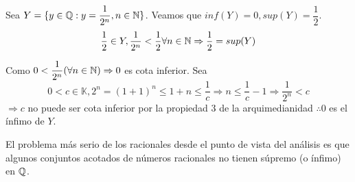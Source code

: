 \begin{eg}
    Sea $Y = \{ y \in \mathbb{Q} : y=\dfrac{1}{2^n}, n\in \mathbb{N} \}$. Veamos que $inf(Y) =0, sup(Y) = \dfrac{1}{2}$.
    \begin{equation}
        \dfrac{1}{2} \in Y, \dfrac{1}{2^n}<\dfrac{1}{2} \forall n \in \mathbb{N} \Rightarrow \dfrac{1}{2} = sup(Y)
    \end{equation}

    Como $0 < \dfrac{1}{2^n} (\forall n \in \mathbb{N}) \Rightarrow 0$ es cota inferior.
    Sea
    \begin{equation}
        0 < c \in \mathbb{K}, 2^n = (1+1)^n \leq 1+n \leq \dfrac{1}{c} \Rightarrow n \leq \dfrac{1}{c} -1 \Rightarrow \dfrac{1}{2^n} < c
    \end{equation}
    $\Rightarrow c$ no puede ser cota inferior por la propiedad 3 de la arquimedianidad $\therefore 0$ es el ínfimo de $Y$.
\end{eg}

El problema más serio de los racionales desde el punto de vista del análisis es que algunos conjuntos acotados de números racionales no tienen súpremo (o ínfimo) en $\mathbb{Q}$.

